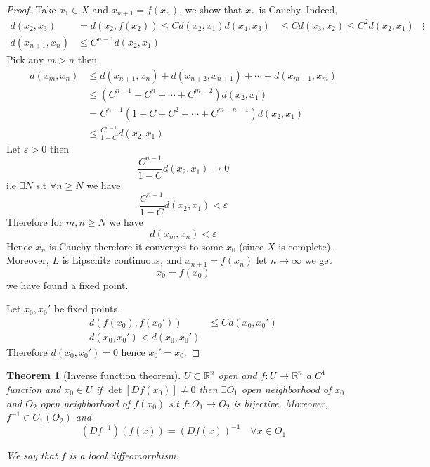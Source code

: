 \documentclass[11pt,a4paper]{article}
\theoremstyle{definition}
\theoremstyle{plain}
\newtheorem{theorem}[definition]{Theorem}
\theoremstyle{remark}
\newcommand{\R}{\mathbb{R}}
\begin{document}
\begin{proof}
    Take $x_1 \in X$ and $x_{n+1} = f(x_n)$, we show that $x_n$ is Cauchy. Indeed, 
    \begin{align*}
        d(x_2, x_3) &= d(x_2, f(x_2)) \le C d(x_2, x_1)
        d(x_4, x_3) &\le Cd(x_3,x_2) \le C^2 d(x_2, x_1)
        &\vdots\\
        d(x_{n+1}, x_n) &\le C^{n-1} d(x_2, x_1)
    \end{align*}
    Pick any $m > n$ then 
    \begin{align*}
        d(x_m, x_n) &\le d(x_{n+1}, x_n) + d(x_{n+2}, x_{n+1}) + \cdots + d(x_{m-1}, x_m) \\
        &\le (C^{n-1} + C^n + \cdots + C^{m-2}) d(x_2, x_1) \\
        &= C^{n-1} (1 + C + C^2 + \cdots + C^{m-n-1}) d(x_2, x_1) \\
        &\le \frac{C^{n-1}}{1-C} d(x_2, x_1)
    \end{align*}
    Let $\varepsilon > 0$ then 
    $$\frac{C^{n-1}}{1-C} d(x_2, x_1) \to 0$$
    i.e $\exists N$ s.t $\forall n \ge N$ we have 
    $$\frac{C^{n-1}}{1-C} d(x_2, x_1) < \varepsilon$$
    Therefore for $m, n \ge N$ we have 
    $$d(x_m, x_n) < \varepsilon$$
    Hence $x_n$ is Cauchy therefore it converges to some $x_0$ (since $X$ is complete). Moreover, $L$ is Lipschitz continuous, 
    and $x_{n+1} = f(x_n)$ let $n \to \infty$ we get 
    $$x_0 = f(x_0)$$
    we have found a fixed point. 

    Let $x_0, x_0'$ be fixed points, 
    \begin{align*}
        d(f(x_0), f(x_0')) &\le C d(x_0, x_0') \\
        d(x_0, x_0') < d(x_0, x_0') 
    \end{align*}
    Therefore $d(x_0, x_0') = 0$ hence $x_0' = x_0$. 
\end{proof}

\begin{theorem}[Inverse function theorem]
    $U \subset \R^n$ open and $f \colon U \to \R^n$ a $C^1$ function and $x_0 \in U$ if 
    $\det [Df(x_0)] \ne 0$ then $\exists O_1$ open neighborhood of $x_0$ and $O_2$ open neighborhood of $f(x_0)$ s.t 
    $f \colon O_1 \to O_2$ is bijective. Moreover, $f^{-1} \in C_1(O_2)$ and 
    $$(Df^{-1}) (f(x)) = (Df(x))^{-1} \quad \forall x \in O_1$$

    We say that $f$ is a local diffeomorphism.
\end{theorem}
\end{document}
